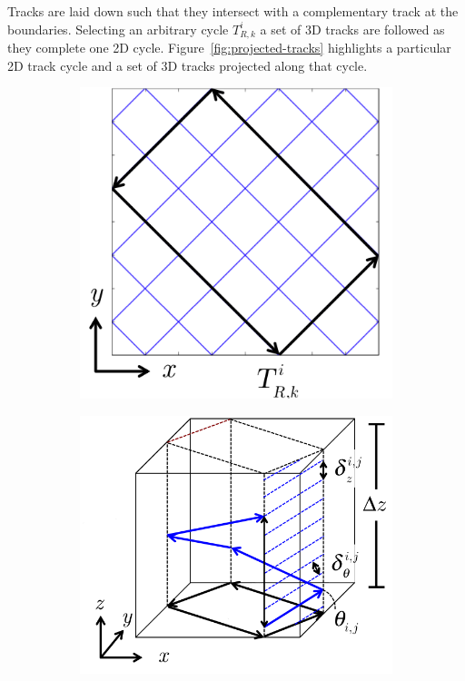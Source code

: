 Tracks are laid down such that they intersect with a complementary track at the boundaries. Selecting an arbitrary cycle $T_{R,k}^{i}$ a set of 3D tracks are followed as they complete one 2D cycle. Figure~\ref{fig:projected-tracks} highlights a particular 2D track cycle and a set of 3D tracks projected along that cycle.

\begin{figure}[h!]
	\centering
	\begin{subfigure}{0.35\textwidth}
		\centering
		\vspace{0.15in}
		\includegraphics[width=\linewidth]{figures/laydown/track_cycles_3_a.png}
		\caption{}
		\label{fig:projected-tracks-a}
	\end{subfigure}
	\begin{subfigure}{0.45\textwidth}
		\centering
		\includegraphics[width=\linewidth]{figures/laydown/track_cycles_3_b.png}

\end{subfigure}
\end{figure}
